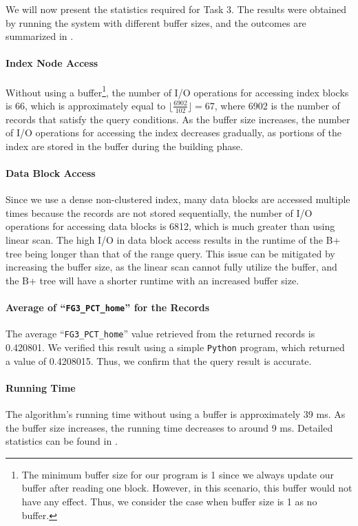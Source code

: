 We will now present the statistics required for Task 3. The results were obtained by running the system with different buffer sizes, and the outcomes are summarized in .

\paragraph{Index Node Access} Without using a buffer\footnote{The minimum buffer size for our program is 1 since we always update our buffer after reading one block. However, in this scenario, this buffer would not have any effect. Thus, we consider the case when buffer size is 1 as no buffer.}, the number of I/O operations for accessing index blocks is 66, which is approximately equal to $\lfloor \frac{6902}{102} \rfloor = 67$, where 6902 is the number of records that satisfy the query conditions. As the buffer size increases, the number of I/O operations for accessing the index decreases gradually, as portions of the index are stored in the buffer during the building phase.

\paragraph{Data Block Access} Since we use a dense non-clustered index, many data blocks are accessed multiple times because the records are not stored sequentially, the number of I/O operations for accessing data blocks is 6812, which is much greater than using linear scan. The high I/O in data block access results in the runtime of the B+ tree being longer than that of the range query. This issue can be mitigated by increasing the buffer size, as the linear scan cannot fully utilize the buffer, and the B+ tree will have a shorter runtime with an increased buffer size.

\paragraph{Average of ``\texttt{FG3\_PCT\_home}'' for the Records} The average ``\texttt{FG3\_PCT\_home}'' value retrieved from the returned records is 0.420801. We verified this result using a simple \texttt{Python} program, which returned a value of 0.4208015. Thus, we confirm that the query result is accurate.

\paragraph{Running Time} The algorithm's running time without using a buffer is approximately 39 ms. As the buffer size increases, the running time decreases to around 9 ms. Detailed statistics can be found in .

